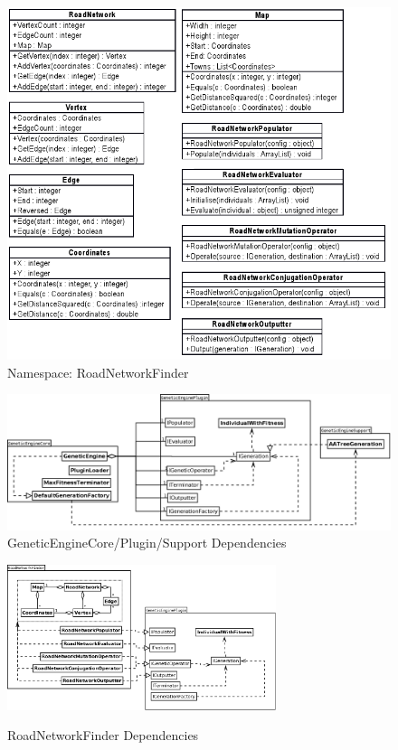 \begin{figure}[ht!]
 \caption{Namespace: RoadNetworkFinder}\label{fig:RoadNetworkFinder}
 \centering
 \includegraphics[width=\textwidth]{../RoadNetworkFinderDetail.png}
\end{figure}

\begin{figure}[ht!]
 \caption{GeneticEngineCore/Plugin/Support Dependencies}\label{fig:GeneticEngineDependencies}
 \centering
 \includegraphics[width=\textwidth]{../GeneticEngineCorePluginSupport.png}
\end{figure}

\begin{figure}[ht!]
 \caption{RoadNetworkFinder Dependencies}
 \centering
 \includegraphics[width=0.7\textwidth]{../RoadNetworkFinder.png}\label{fig:RoadNetworkFinderDependencies}
\end{figure}

